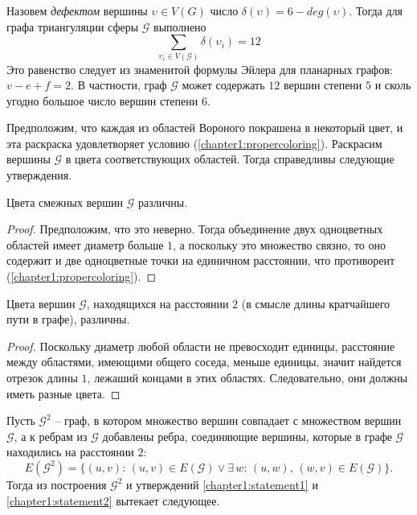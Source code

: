 Назовем \textit{дефектом} вершины $\upsilon \in V(G)$ 
число $\delta(\upsilon) = 6 - deg(\upsilon)$. 
Тогда для графа триангуляции сферы $\mathcal{G}$ выполнено 
\begin{equation}\label{chapter1:eq:defect}
\sum\limits_{\upsilon_i \in V(\mathcal{G})} \delta(\upsilon_i) = 12
\end{equation}
Это равенство следует из знаменитой формулы Эйлера для планарных графов: 
$v - e + f = 2$.
В частности, граф $\mathcal{G}$ может содержать $12$ вершин степени $5$ и сколь угодно большое число вершин степени $6$. 

Предположим, что каждая из областей Вороного покрашена в некоторый цвет, и эта раскраска удовлетворяет условию 
(\ref{chapter1:propercoloring}). Раскрасим вершины $\mathcal{G}$ в цвета соответствующих областей. Тогда справедливы следующие утверждения.

\begin{statement}\label{chapter1:statement1}
Цвета смежных вершин $\mathcal{G}$ различны. 
\end{statement}

\begin{proof}
Предположим, что это неверно. Тогда объединение двух одноцветных областей имеет диаметр больше $1$, а поскольку это множество связно, то оно содержит и две одноцветные точки на единичном расстоянии, что противореит (\ref{chapter1:propercoloring}).
\end{proof}
 
\begin{statement}\label{chapter1:statement2}
Цвета вершин $\mathcal{G}$, находящихся на расстоянии $2$ (в смысле длины кратчайшего пути в графе), различны. 
\end{statement}

\begin{proof}
Поскольку диаметр любой области не превосходит единицы, расстояние между областями, имеющими общего соседа, меньше единицы,
значит найдется отрезок длины $1$, лежаший концами в этих областях. Следовательно, они должны иметь разные цвета.
\end{proof}

Пусть $\mathcal{G}^2$ -- граф, в котором множество вершин совпадает с множеством вершин $\mathcal{G}$, 
а к ребрам из $\mathcal{G}$  добавлены ребра, соединяющие вершины, 
которые в графе $\mathcal{G}$ находились на расстоянии $2$:
$$E(\mathcal{G}^2) = \{ (u,v): \, (u,v) \in E(\mathcal{G}) \lor \exists \, w: \, (u,w),\,(w,v) \in E(\mathcal{G}) \}.$$
Тогда из построения $\mathcal{G}^2$ и утверждений 
\ref{chapter1:statement1} и \ref{chapter1:statement2} вытекает следующее.

